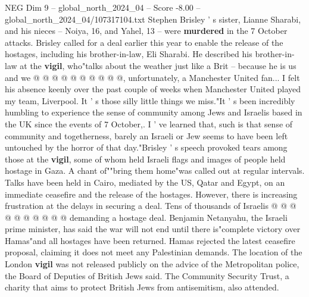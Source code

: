 \begin{textsample}{NEG Dim 9 – global\_north\_2024\_04 – Score -8.00 – global\_north\_2024\_04/107317104.txt}
Stephen Brisley ' s sister, Lianne Sharabi, and his nieces -- Noiya, 16, and Yahel, 13 -- were \textbf{murdered} in the 7 October attacks.
Brisley called for a deal earlier this year to enable the release of the hostages, including his brother-in-law, Eli Sharabi.
He described his brother-in-law at the \textbf{vigil}, who"talks about the weather just like a Brit -- because he is us and we @ @ @ @ @ @ @ @ @ @, unfortunately, a Manchester United fan...
I felt his absence keenly over the past couple of weeks when Manchester United played my team, Liverpool.
It ' s those silly little things we miss."It ' s been incredibly humbling to experience the sense of community among Jews and Israelis based in the UK since the events of 7 October,.
I ' ve learned that, such is that sense of community and togetherness, barely an Israeli or Jew seems to have been left untouched by the horror of that day."Brisley ' s speech provoked tears among those at the \textbf{vigil}, some of whom held Israeli flags and images of people held hostage in Gaza.
A chant of""bring them home"was called out at regular intervals.
Talks have been held in Cairo, mediated by the US, Qatar and Egypt, on an immediate ceasefire and the release of the hostages.
However, there is increasing frustration at the delays in securing a deal.
Tens of thousands of Israelis @ @ @ @ @ @ @ @ @ @ demanding a hostage deal.
Benjamin Netanyahu, the Israeli prime minister, has said the war will not end until there is"complete victory over Hamas"and all hostages have been returned.
Hamas rejected the latest ceasefire proposal, claiming it does not meet any Palestinian demands.
The location of the London \textbf{vigil} was not released publicly on the advice of the Metropolitan police, the Board of Deputies of British Jews said.
The Community Security Trust, a charity that aims to protect British Jews from antisemitism, also attended.

\end{textsample}
